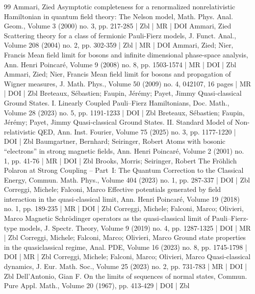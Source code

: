 \begin{thebibliography}{99}
 Ammari, Zied Asymptotic completeness for a renormalized nonrelativistic Hamiltonian in quantum field theory: The Nelson model, Math. Phys. Anal. Geom., Volume 3 (2000) no. 3, pp. 217-285 | Zbl | MR | DOI
 Ammari, Zied Scattering theory for a class of fermionic Pauli-Fierz models, J. Funct. Anal., Volume 208 (2004) no. 2, pp. 302-359 | Zbl | MR | DOI
 Ammari, Zied; Nier, Francis Mean field limit for bosons and infinite dimensional phase-space analysis, Ann. Henri Poincaré, Volume 9 (2008) no. 8, pp. 1503-1574 | MR | DOI | Zbl
 Ammari, Zied; Nier, Francis Mean field limit for bosons and propagation of Wigner measures, J. Math. Phys., Volume 50 (2009) no. 4, 042107, 16 pages | MR | DOI | Zbl
 Breteaux, Sébastien; Faupin, Jérémy; Payet, Jimmy Quasi-classical Ground States. I. Linearly Coupled Pauli–Fierz Hamiltonians, Doc. Math., Volume 28 (2023) no. 5, pp. 1191-1233 | DOI | Zbl
 Breteaux, Sébastien; Faupin, Jérémy; Payet, Jimmy Quasi-classical Ground States. II. Standard Model of Non-relativistic QED, Ann. Inst. Fourier, Volume 75 (2025) no. 3, pp. 1177-1220 | DOI | Zbl
 Baumgartner, Bernhard; Seiringer, Robert Atoms with bosonic “electrons” in strong magnetic fields, Ann. Henri Poincaré, Volume 2 (2001) no. 1, pp. 41-76 | MR | DOI | Zbl
 Brooks, Morris; Seiringer, Robert The Fröhlich Polaron at Strong Coupling – Part I: The Quantum Correction to the Classical Energy, Commun. Math. Phys., Volume 404 (2023) no. 1, pp. 287-337 | DOI | Zbl
 Correggi, Michele; Falconi, Marco Effective potentials generated by field interaction in the quasi-classical limit, Ann. Henri Poincaré, Volume 19 (2018) no. 1, pp. 189-235 | MR | DOI | Zbl
 Correggi, Michele; Falconi, Marco; Olivieri, Marco Magnetic Schrödinger operators as the quasi-classical limit of Pauli–Fierz-type models, J. Spectr. Theory, Volume 9 (2019) no. 4, pp. 1287-1325 | DOI | MR | Zbl
 Correggi, Michele; Falconi, Marco; Olivieri, Marco Ground state properties in the quasiclassical regime, Anal. PDE, Volume 16 (2023) no. 8, pp. 1745-1798 | DOI | MR | Zbl
 Correggi, Michele; Falconi, Marco; Olivieri, Marco Quasi-classical dynamics, J. Eur. Math. Soc., Volume 25 (2023) no. 2, pp. 731-783 | MR | DOI | Zbl
 Dell’Antonio, Gian F. On the limits of sequences of normal states, Commun. Pure Appl. Math., Volume 20 (1967), pp. 413-429 | DOI | Zbl

\end{thebibliography}
